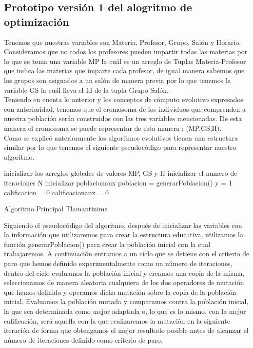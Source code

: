 \subsection{Prototipo versión 1 del alogritmo de optimización}

Tenemos que nuestras variables son Materia, Profesor, Grupo, Salón y Horario. Consideramos que no todos los profesores pueden impartir todas las materias por lo que se toma una variable MP la cuál es un arreglo de Tuplas Materia-Profesor que indica las materias que imparte cada profesor, de igual manera sabemos que los grupos son asignados a un salón de manera previa por lo que tenemos la variable GS la cuál lleva el Id de la tupla Grupo-Salón.\\

Teniendo en cuenta lo anterior y los conceptos de cómputo evolutivo expresados con anterioridad, tenemos que el cromosoma de los individuos que comprenden a nuestra población serán construidos con las tres variables mencionadas. De esta manera el cromosoma se puede representar de esta manera : (MP,GS,H).\\

Como se explicó anteriormente los algoritmos evolutivos tienen una estructura similar por lo que tenemos el siguiente pseudocódigo para representar nuestro algoritmo.\\

\begin{algorithm}[H]
	\DontPrintSemicolon
	\SetAlgoLined
	inicializar los arreglos globales de valores MP, GS y H\;
	inicializar el numero de iteraciones N\;
	inicializar poblacionaux\;
	poblacion = generarPoblacion()\;
	y = 1\;
	calificacion = 0 \;
	calificacionaux = 0 \;
	
	\caption{Algoritmo Principal Tlamantinime}
\end{algorithm}

Siguiendo el pseudocódigo del algoritmo, después de inicializar las variables con la información que utilizaremos para crear la estructura educativa, utilizamos la función generarPoblacion() para crear la población inicial con la cual trabajaremos. A continuación entramos a un ciclo que se detiene con el criterio de paro que hemos definido experimentalmente como un número de iteraciones, dentro del ciclo evaluamos la población inicial y creamos una copia de la misma, seleccionamos de manera aleatoria cualquiera de los dos operadores de mutación que hemos definido y operamos dicha mutación sobre la copia de la población inicial. Evaluamos la población mutada y comparamos contra la población inicial, la que sea determinada como mejor adaptada o, lo que es lo mismo, con la mejor calificación, será aquella con la que realizaremos la mutación en la siguiente iteración de forma que obtengamos el mejor resultado posible antes de alcanzar el número de iteraciones definido como criterio de paro.

